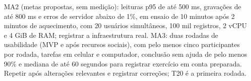 MA2 (metas propostas, sem medição): leituras p95 de até 500 ms, gravações de até 800 ms e erros de servidor abaixo de 1\%, em ensaio de 10 minutos após 2 minutos de aquecimento, com 20 usuários simultâneos, 100 mil registros, 2 vCPU e 4 GiB de RAM; registrar a infraestrutura real. MA3: duas rodadas de usabilidade (MVP e após recursos sociais), com pelo menos cinco participantes por rodada, tarefas em celular e computador, conclusão sem ajuda de pelo menos 90\% e mediana de até 60 segundos para registrar exercício em conta preparada. Repetir após alterações relevantes e registrar correções; T20 é a primeira rodada.
